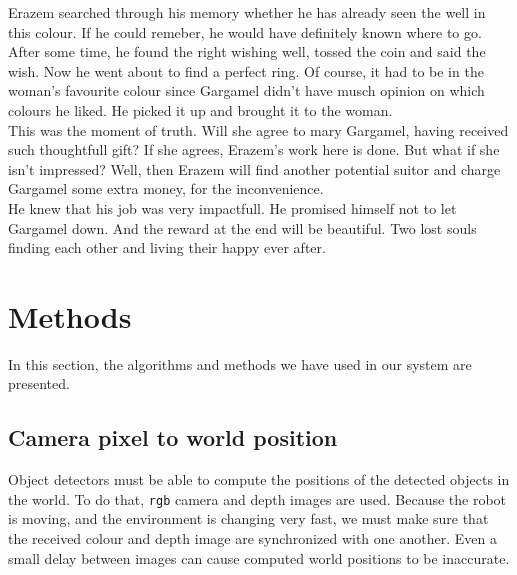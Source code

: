 \documentclass[12pt,a4paper]{article}
\begin{document}
	Erazem searched through his memory whether he has already seen the well in this colour. If he could remeber, he would have definitely known where to go. After some time, he found the right wishing well, tossed the coin and said the wish. Now he went about to find a perfect ring. Of course, it had to be in the woman's favourite colour since Gargamel didn't have musch opinion on which colours he liked. He picked it up and brought it to the woman. \\
	
	This was the moment of truth. Will she agree to mary Gargamel, having received such thoughtfull gift? If she agrees, Erazem's work here is done. But what if she isn't impressed? Well, then Erazem will find another potential suitor and charge Gargamel some extra money, for the inconvenience. \\

	He knew that his job was very impactfull. He promised himself not to let Gargamel down. And the reward at the end will be beautiful. Two lost souls finding each other and living their happy ever after.

	
	\section{Methods} \label{methods}
	In this section, the algorithms and methods we have used in our system are presented.

	
	\subsection{Camera pixel to world position} \label{pixel_to_world}
	Object detectors must be able to compute the positions of the detected objects in the world. To do that, \texttt{rgb} camera and depth images are used. Because the robot is moving, and the environment is changing very fast, we must make sure that the received colour and depth image are synchronized with one another. Even a small delay between images can cause computed world positions to be inaccurate. \\ 
	
\end{document}
